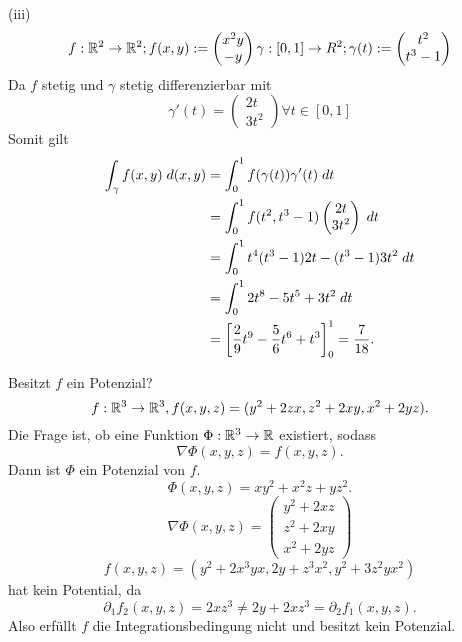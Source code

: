 \documentclass[../ana2u.tex]{subfiles}
\begin{document}
\begin{bsp}
    (iii) \[\abb{f}{\R^2}{\R^2}; f(x,y) := \begin{pmatrix} x^2y \\ -y \end{pmatrix} 
    \abb{\gamma}{[0, 1]}{R^2}; \gamma(t) := \begin{pmatrix} t^2 \\ t^3 - 1 \end{pmatrix}\]
    Da \(f\) stetig und \(\gamma\) stetig differenzierbar mit
    \[ \gamma'(t) = \begin{pmatrix}
        2t\\3t^2
    \end{pmatrix} \forall t \in [0, 1] \]
    Somit gilt 
    \begin{align*}
        \int_\gamma f(x,y) \; d(x,y) &= \integralx{ f(\gamma(t)) \gamma'(t) }{0}{1}{t}\\
        &= \integralx{ f(t^2, t^3 - 1) \begin{pmatrix} 2t \\ 3t^2 \end{pmatrix} }{0}{1}{t} \\
        &= \integralx{ t^4(t^3 - 1)2t - (t^3 - 1)3t^2 }{0}{1}{t} \\
        &= \integralx{ 2t^8 - 5t^5 + 3t^2 }{0}{1}{t} \\
        &= \left[ \frac{2}{9}t^9 - \frac{5}{6}t^6 + t^3 \right]_0^1 = \frac{7}{18}.
    \end{align*}
\end{bsp}
\begin{bsp}[Aufgabe 67]
    Besitzt \(f\) ein Potenzial?
    \[ \abb{f}{\R^3}{\R^3}, f(x,y,z) = (y^2 + 2zx, z^2 + 2xy, x^2 + 2yz). \]
    Die Frage ist, ob eine Funktion \( \abb{\Phi}{\R^3}{\R} \) existiert, sodass 
    \[ \nabla \Phi(x,y,z) = f(x,y,z). \]
    Dann ist \(\Phi\) ein Potenzial von \(f\).
    \[ \Phi(x,y,z) = xy^2 + x^2 z + yz^2. \]
    \[ \nabla \Phi(x,y,z) = \begin{pmatrix} y^2 + 2xz \\ z^2 + 2xy \\ x^2 + 2yz \end{pmatrix} \]
    \[ f(x,y,z) = (y^2 + 2x^3 y x, 2y + z^3 x^2, y^2 + 3z^2 y x^2) \]
    hat kein Potential, da 
    \[ \partial_1 f_2(x,y,z) = 2xz^3 \neq 2y + 2xz^3 = \partial_2 f_1(x,y,z). \]
    Also erfüllt \(f\) die Integrationsbedingung nicht und besitzt kein Potenzial.
\end{bsp}
\end{document}
